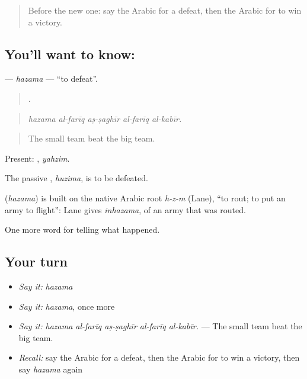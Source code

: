 \label{lesson:AR-C315-hazama-defeat}



\begin{quote}
Before the new one: say the Arabic for a defeat, then the Arabic for to win a victory.
\end{quote}

\subsection*{You'll want to know: }
\textbf{} — \emph{hazama} — \textquotedblleft{}to defeat\textquotedblright{}.

\begin{quote}
    .
\end{quote}

\begin{quote}
\emph{hazama al-farīq aṣ-ṣaghīr al-farīq al-kabīr.}
\end{quote}

\begin{quote}
The small team beat the big team.
\end{quote}

Present: , \emph{yahzim}.

The passive , \emph{huzima}, is to be defeated.

\begin{cousinweb}
\textbf{} (\emph{hazama}) is built on the native Arabic root \emph{h-z-m} (Lane), \textquotedblleft{}to rout; to put an army to flight\textquotedblright{}: Lane gives \emph{inhazama}, of an army that was routed.
\end{cousinweb}

\begin{grammarlens}[title={What you've built}]
One more word for telling what happened.
\end{grammarlens}

\subsection*{Your turn}
\begin{itemize}
\raggedright
  \item \emph{Say it:} \emph{hazama}
  \item \emph{Say it:} \emph{hazama}, once more
  \item \emph{Say it:} \emph{hazama al-farīq aṣ-ṣaghīr al-farīq al-kabīr.} — The small team beat the big team.
  \item \emph{Recall:} say the Arabic for a defeat, then the Arabic for to win a victory, then say \emph{hazama} again
\end{itemize}


